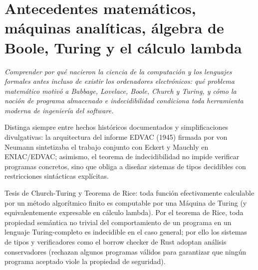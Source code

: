 \documentclass{book}
\begin{document}
\chapter{Antecedentes matemáticos, máquinas analíticas, álgebra de Boole, Turing y el cálculo lambda}
\label{chap:cap01-antecedentes-y-computabilidad}

\noindent\textit{Comprender por qué nacieron la ciencia de la computación y los lenguajes formales antes incluso de existir los ordenadores electrónicos: qué problema matemático motivó a Babbage, Lovelace, Boole, Church y Turing, y cómo la noción de programa almacenado e indecidibilidad condiciona toda herramienta moderna de ingeniería del software.}

\begin{tcolorbox}[title={Consejo}, studiumtip, breakable]

Distinga siempre entre hechos históricos documentados y simplificaciones divulgativas: la arquitectura del informe EDVAC (1945) firmada por von Neumann sintetizaba el trabajo conjunto con Eckert y Mauchly en ENIAC/EDVAC; asimismo, el teorema de indecidibilidad no impide verificar programas concretos, sino que obliga a diseñar sistemas de tipos decidibles con restricciones sintácticas explícitas.
\end{tcolorbox}

\begin{tcolorbox}[title={Definición}, studiumdef, breakable]

Tesis de Church-Turing y Teorema de Rice: toda función efectivamente calculable por un método algorítmico finito es computable por una Máquina de Turing (y equivalentemente expresable en cálculo lambda). Por el teorema de Rice, toda propiedad semántica no trivial del comportamiento de un programa en un lenguaje Turing-completo es indecidible en el caso general; por ello los sistemas de tipos y verificadores como el borrow checker de Rust adoptan análisis conservadores (rechazan algunos programas válidos para garantizar que ningún programa aceptado viole la propiedad de seguridad).
\end{tcolorbox}
\end{document}
